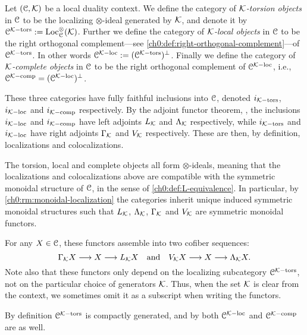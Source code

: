 \begin{construction}
    \label{ch0:const:local-duality-categories}
    Let $(\EuScript{C}, \mathcal{K})$ be a local duality context. We define the category of \emph{$\mathcal{K}$-torsion objects} in $\EuScript{C}$ to be the localizing $\otimes$-ideal generated by $\mathcal{K}$, and denote it by $\EuScript{C}^{\mathcal{K}-\mathrm{tors}}:= \operatorname{Loc}_{\EuScript{C}}^\otimes(\mathcal{K})$. Further we define the category of \emph{$\mathcal{K}$-local objects} in $\EuScript{C}$ to be the right orthogonal complement---see \cref{ch0:def:right-orthogonal-complement}---of $\EuScript{C}^{\mathcal{K}-\mathrm{tors}}$. In other words $\EuScript{C}^{\mathcal{K}-\mathrm{loc}} := (\EuScript{C}^{\mathcal{K}-\mathrm{tors}})^\perp$. Finally we define the category of \emph{$\mathcal{K}$-complete objects} in $\EuScript{C}$ to be the right orthogonal complement of $\EuScript{C}^{\mathcal{K}-\mathrm{loc}}$, i.e., $\EuScript{C}^{\mathcal{K}-\mathrm{comp}}= (\EuScript{C}^{\mathcal{K}-\mathrm{loc}})^\perp$. 
    
    These three categories have fully faithful inclusions into $\EuScript{C}$, denoted $i_{\mathcal{K}-\mathrm{tors}}$, $i_{\mathcal{K}-\mathrm{loc}}$ and $i_{\mathcal{K}-\mathrm{comp}}$ respectively. By the adjoint functor theorem, \cite[5.5.2.9]{lurie_09}, the inclusions $i_{\mathcal{K}-\mathrm{loc}}$ and $i_{\mathcal{K}-\mathrm{comp}}$ have left adjoints $L_{\mathcal{K}}$ and $\Lambda_{\mathcal{K}}$ respectively, while $i_{\mathcal{K}-\mathrm{tors}}$ and $i_{\mathcal{K}-\mathrm{loc}}$ have right adjoints $\Gamma_{\mathcal{K}}$ and $V_{\mathcal{K}}$ respectively. These are then, by definition, localizations and colocalizations. 
    
    The torsion, local and complete objects all form $\otimes$-ideals, meaning that the localizations and colocalizations above are compatible with the symmetric monoidal structure of $\EuScript{C}$, in the sense of \cref{ch0:def:L-equivalence}. In particular, by \cref{ch0:rm:monoidal-localization} the categories inherit unique induced symmetric monoidal structures such that $L_{\mathcal{K}}$, $\Lambda_{\mathcal{K}}$, $\Gamma_{\mathcal{K}}$ and $V_{\mathcal{K}}$ are symmetric monoidal functors. 

    For any $X\in \EuScript{C}$, these functors assemble into two cofiber sequences:
    \[\Gamma_{\mathcal{K}} X \longrightarrow X \longrightarrow L_{\mathcal{K}} X \quad \text{and}\quad V_{\mathcal{K}} X \longrightarrow X \longrightarrow \Lambda_{\mathcal{K}} X.\]
    Note also that these functors only depend on the localizing subcategory $\EuScript{C}^{\mathcal{K}-\mathrm{tors}}$, not on the particular choice of generators $\mathcal{K}$. Thus, when the set $\mathcal{K}$ is clear from the context, we sometimes omit it as a subscript when writing the functors. 
\end{construction}

\begin{remark}
    \label{ch0:rm:tors-loc-comp-compactly-generated}
    By definition $\EuScript{C}^{\mathcal{K}-\mathrm{tors}}$ is compactly generated, and by \cite[2.17]{barthel-heard-valenzuela_2018} both $\EuScript{C}^{\mathcal{K}-\mathrm{loc}}$ and $\EuScript{C}^{\mathcal{K}-\mathrm{comp}}$ are as well. 
\end{remark}

